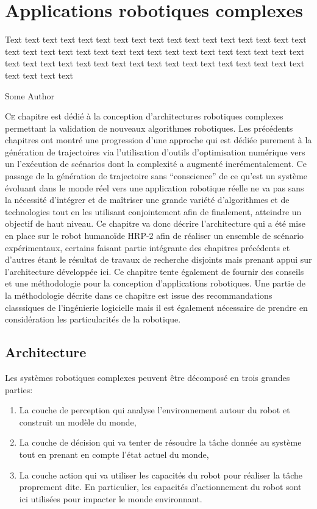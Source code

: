 \chapter{Applications robotiques complexes}
\label{chap:integration}

\epigraph{Text text text text text text text text text text text text
  text text text text text text text text text text text text text
  text text text text text text text text text text text text text
  text text text text text text text text text text text text text
  text text text text}{Some Author}
\clearpage

\lettrine[lines=2, lraise=0.1, nindent=0em, slope=-.5em]%
{C}{e} chapitre est dédié à la conception d'architectures robotiques
complexes permettant la validation de nouveaux algorithmes robotiques.
Les précédents chapitres ont montré une progression d'une approche
qui est dédiée purement à la génération de trajectoires via
l'utilisation d'outils d'optimisation numérique vers un l'exécution de
scénarios dont la complexité a augmenté incrémentalement. Ce passage
de la génération de trajectoire sans ``conscience'' de ce qu'est un
système évoluant dans le monde réel vers une application robotique
réelle ne va pas sans la nécessité d'intégrer et de maîtriser une
grande variété d'algorithmes et de technologies tout en les utilisant
conjointement afin de finalement, atteindre un objectif de haut
niveau. Ce chapitre va donc décrire l'architecture qui a été mise en
place sur le robot humanoïde HRP-2 afin de réaliser un ensemble de
scénario expérimentaux, certains faisant partie intégrante des
chapitres précédents et d'autres étant le résultat de travaux de
recherche disjoints mais prenant appui sur l'architecture développée
ici. Ce chapitre tente également de fournir des conseils et une
méthodologie pour la conception d'applications robotiques. Une partie
de la méthodologie décrite dans ce chapitre est issue des
recommandations classsiques de l'ingénierie logicielle mais il est
également nécessaire de prendre en considération les particularités de
la robotique.

\section{Architecture}


Les systèmes robotiques complexes peuvent être décomposé en trois
grandes parties:

\begin{enumerate}
\item La couche de perception qui analyse
  l'environnement autour du robot et construit un modèle du monde,
\item La couche de décision qui va tenter de résoudre
  la tâche donnée au système tout en prenant en compte l'état actuel
  du monde,
\item La couche action qui va utiliser les capacités du robot pour
  réaliser la tâche proprement dite. En particulier, les capacités
  d'actionnement du robot sont ici utilisées pour impacter le monde
  environnant.
\end{enumerate}


